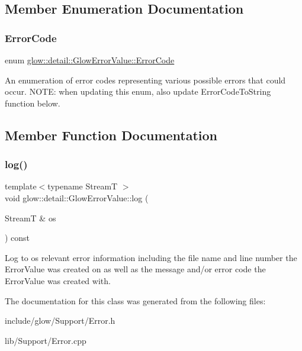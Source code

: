 \subsection{Member Enumeration Documentation}
\mbox{\label{classglow_1_1detail_1_1_glow_error_value_a0c0ed8bba0a9859c023dd4b9b5233c37}} 
\subsubsection{\texorpdfstring{Error\+Code}{ErrorCode}}
{\footnotesize\ttfamily enum \hyperlink{classglow_1_1detail_1_1_glow_error_value_a0c0ed8bba0a9859c023dd4b9b5233c37}{glow\+::detail\+::\+Glow\+Error\+Value\+::\+Error\+Code}\hspace{0.3cm}{\ttfamily [strong]}}

An enumeration of error codes representing various possible errors that could occur. N\+O\+TE\+: when updating this enum, also update Error\+Code\+To\+String function below. 

\subsection{Member Function Documentation}
\mbox{\label{classglow_1_1detail_1_1_glow_error_value_adf50591b65a36cc2aed5c8b0f558e66b}} 
\subsubsection{\texorpdfstring{log()}{log()}}
{\footnotesize\ttfamily template$<$typename StreamT $>$ \\
void glow\+::detail\+::\+Glow\+Error\+Value\+::log (\begin{DoxyParamCaption}\item[{StreamT \&}]{os }\end{DoxyParamCaption}) const\hspace{0.3cm}{\ttfamily [inline]}}

Log to {\ttfamily os} relevant error information including the file name and line number the Error\+Value was created on as well as the message and/or error code the Error\+Value was created with. 

The documentation for this class was generated from the following files\+:\begin{DoxyCompactItemize}
\item 
include/glow/\+Support/Error.\+h\item 
lib/\+Support/Error.\+cpp\end{DoxyCompactItemize}
